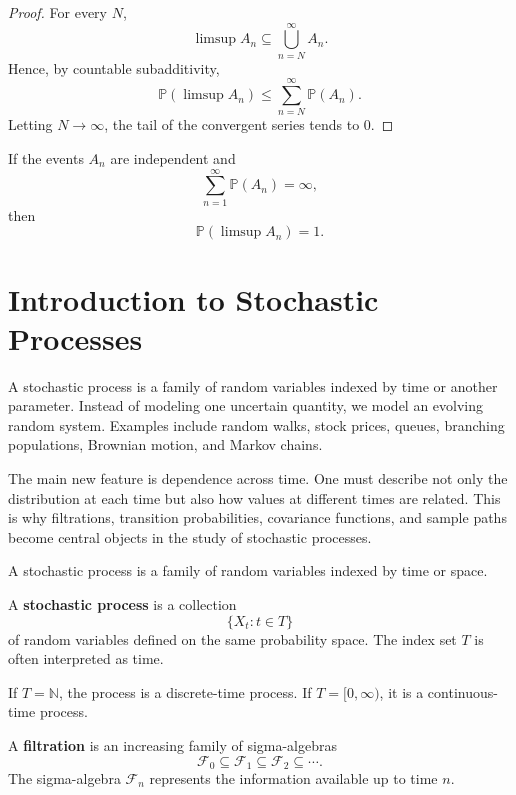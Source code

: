 \begin{proof}
For every $N$,
\[
    \limsup A_n\subseteq\bigcup_{n=N}^{\infty}A_n.
\]
Hence, by countable subadditivity,
\[
    \mathbb{P}(\limsup A_n)\leq\sum_{n=N}^{\infty}\mathbb{P}(A_n).
\]
Letting $N\to\infty$, the tail of the convergent series tends to $0$.
\end{proof}

\begin{theorem}
If the events $A_n$ are independent and
\[
    \sum_{n=1}^{\infty}\mathbb{P}(A_n)=\infty,
\]
then
\[
    \mathbb{P}(\limsup A_n)=1.
\]
\end{theorem}

\section{Introduction to Stochastic Processes}


A stochastic process is a family of random variables indexed by time or another parameter. Instead of modeling one uncertain quantity, we model an evolving random system. Examples include random walks, stock prices, queues, branching populations, Brownian motion, and Markov chains.

The main new feature is dependence across time. One must describe not only the distribution at each time but also how values at different times are related. This is why filtrations, transition probabilities, covariance functions, and sample paths become central objects in the study of stochastic processes.

A stochastic process is a family of random variables indexed by time or space.

\begin{definition}
A \textbf{stochastic process} is a collection
\[
    \{X_t:t\in T\}
\]
of random variables defined on the same probability space. The index set $T$ is often interpreted as time.
\end{definition}

\begin{example}
If $T=\mathbb{N}$, the process is a discrete-time process. If $T=[0,\infty)$, it is a continuous-time process.
\end{example}

\begin{definition}[Filtration]
A \textbf{filtration} is an increasing family of sigma-algebras
\[
    \mathcal{F}_0\subseteq\mathcal{F}_1\subseteq\mathcal{F}_2\subseteq\cdots.
\]
The sigma-algebra $\mathcal{F}_n$ represents the information available up to time $n$.
\end{definition}

